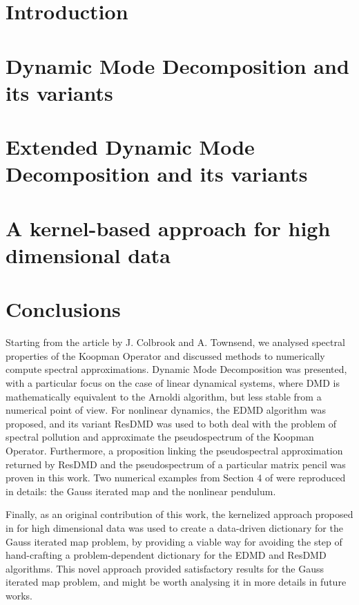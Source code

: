 \documentclass[10pt, a4paper]{report}
\begin{document}
\clearpage
\thispagestyle{empty}
\tableofcontents

\setcounter{page}{1}

\chapter{Introduction}


\chapter{Dynamic Mode Decomposition and its variants}


\chapter{Extended Dynamic Mode Decomposition and its variants}


\chapter{A kernel-based approach for high dimensional data}


\chapter{Conclusions}
Starting from the article \cite{colbrook_rigorous_2021} by J. Colbrook and A. Townsend, we analysed spectral properties of the Koopman Operator and discussed methods to numerically compute spectral approximations. Dynamic Mode Decomposition was presented, with a particular focus on the case of linear dynamical systems, where DMD is mathematically equivalent to the Arnoldi algorithm, but less stable from a numerical point of view. For nonlinear dynamics, the EDMD algorithm was proposed, and its variant ResDMD was used to both deal with the problem of spectral pollution and approximate the pseudospectrum of the Koopman Operator. Furthermore, a proposition linking the pseudospectral approximation returned by ResDMD and the pseudospectrum of a particular matrix pencil was proven in this work. Two numerical examples from Section 4 of \cite{colbrook_rigorous_2021} were reproduced in details: the Gauss iterated map and the nonlinear pendulum. 

Finally, as an original contribution of this work, the kernelized approach proposed in \cite{colbrook_rigorous_2021} for high dimensional data was used to create a data-driven dictionary for the Gauss iterated map problem, by providing a viable way for avoiding the step of hand-crafting a problem-dependent dictionary for the EDMD and ResDMD algorithms. This novel approach provided satisfactory results for the Gauss iterated map problem, and might be worth analysing it in more details in future works.

\nocite{*}
\printbibliography
\end{document}
